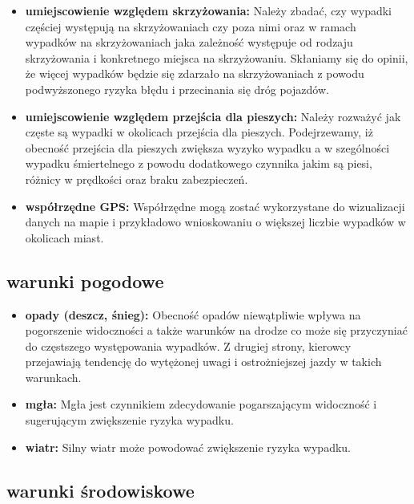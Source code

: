 \begin{itemize}
\itemsep-14pt\parskip0pt
\item
  \textbf{umiejscowienie względem skrzyżowania:} Należy zbadać, czy
  wypadki częściej występują na skrzyżowaniach czy poza nimi oraz w
  ramach wypadków na skrzyżowaniach jaka zależność występuje od rodzaju
  skrzyżowania i konkretnego miejsca na skrzyżowaniu. Skłaniamy się do
  opinii, że więcej wypadków będzie się zdarzało na skrzyżowaniach z
  powodu podwyższonego ryzyka błędu i przecinania się dróg pojazdów.\\
\item
  \textbf{umiejscowienie względem przejścia dla pieszych:} Należy
  rozważyć jak częste są wypadki w okolicach przejścia dla pieszych.
  Podejrzewamy, iż obecność przejścia dla pieszych zwiększa wyzyko
  wypadku a w szególności wypadku śmiertelnego z powodu dodatkowego
  czynnika jakim są piesi, różnicy w prędkości oraz braku
  zabezpieczeń.\\
\item
  \textbf{współrzędne GPS:} Współrzędne mogą zostać wykorzystane do
  wizualizacji danych na mapie i przykładowo wnioskowaniu o większej
  liczbie wypadków w okolicach miast.
\end{itemize}

\subsection{warunki pogodowe}\label{warunki-pogodowe}

\begin{itemize}
\itemsep-14pt\parskip0pt
\item
  \textbf{opady (deszcz, śnieg):} Obecność opadów niewątpliwie wpływa na
  pogorszenie widoczności a także warunków na drodze co może się
  przyczyniać do częstszego występowania wypadków. Z drugiej strony,
  kierowcy przejawiają tendencję do wytężonej uwagi i ostrożniejszej
  jazdy w takich warunkach.\\
\item
  \textbf{mgła:} Mgła jest czynnikiem zdecydowanie pogarszającym
  widoczność i sugerującym zwiększenie ryzyka wypadku.\\
\item
  \textbf{wiatr:} Silny wiatr może powodować zwiększenie ryzyka wypadku.
\end{itemize}

\subsection{warunki środowiskowe}\label{warunki-srodowiskowe}

